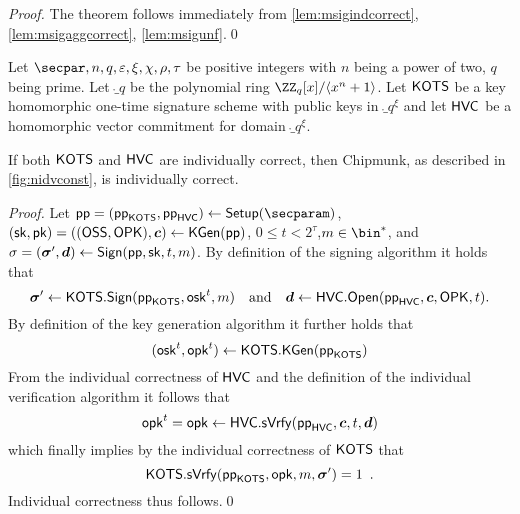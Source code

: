 \begin{proof}
  The theorem follows immediately from \autoref{lem:msigindcorrect}, \autoref{lem:msigaggcorrect}, \autoref{lem:msigunf}.\qed
\end{proof}

\begin{lemma}\label{lem:msigindcorrect}
Let $\secpar,n,q,\varepsilon,\xi,\chi,\rho,\tau$ be positive integers with $n$ being a power of two, $q$ being prime.
Let $\ring_q$ be the polynomial ring $\ZZ_q[x]/\langle x^n+1\rangle$.
Let $\mathsf{KOTS}$ be a key homomorphic one-time signature scheme with public keys in $\ring_q^\xi$ and let $\mathsf{HVC}$ be a homomorphic vector commitment for domain $\ring_q^\xi$.

If both $\mathsf{KOTS}$ and $\mathsf{HVC}$ are individually correct, then Chipmunk, as described in \autoref{fig:nidvconst}, is individually correct.
\end{lemma}
\begin{proof}
  Let $\params=(\hotsparams,\hvcparams)\gets\setup(\secparam)$, $(\mathsf{sk},\mathsf{pk}) = ((\mathsf{OSS},\mathsf{OPK}),\boldsymbol{c})\gets\mathsf{KGen}(\mathsf{pp})$, $0\leq t< 2^\tau$,$m\in\bin^*$, and $\sigma = (\boldsymbol{\sigma}',\boldsymbol{d}) \gets \mathsf{Sign}(\mathsf{pp},\mathsf{sk},t,m)$.
  By definition of the signing algorithm it holds that
  \[
    \boldsymbol{\sigma}' \gets \mathsf{KOTS}.\mathsf{Sign}(\mathsf{pp}_{\mathsf{KOTS}},\mathsf{osk}^t,m) \quad \text{and} \quad \boldsymbol{d} \gets \mathsf{HVC}.\mathsf{Open}(\mathsf{pp}_{\mathsf{HVC}},\boldsymbol{c},\mathsf{OPK},t).
  \]
  By definition of the key generation algorithm it further holds that
  \[
    (\mathsf{osk}^t,\mathsf{opk}^t) \gets \mathsf{KOTS}.\mathsf{KGen}(\mathsf{pp}_{\mathsf{KOTS}})
  \]
  From the individual correctness of $\mathsf{HVC}$ and the definition of the individual verification algorithm it follows that
  \[
    \mathsf{opk}^t = \mathsf{opk} \gets \mathsf{HVC}.\mathsf{sVrfy}(\mathsf{pp}_{\mathsf{HVC}},\boldsymbol{c},t,\boldsymbol{d})
  \]
  which finally implies by the individual correctness of $\mathsf{KOTS}$ that
  \[
    \mathsf{KOTS}.\mathsf{sVrfy}(\mathsf{pp}_{\mathsf{KOTS}},\mathsf{opk},m,\boldsymbol{\sigma}') = 1\enspace.
  \]
  Individual correctness thus follows.\qed
\end{proof}


